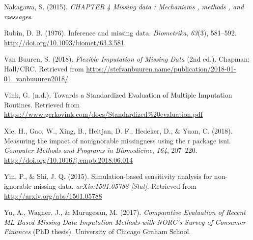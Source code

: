 \documentclass[12pt,oneside]{chicagocapstone}
\begin{document}
\hypertarget{ref-nakagawa_chapter_2015}{}
Nakagawa, S. (2015). \emph{CHAPTER 4 Missing data : Mechanisms , methods
, and messages}.

\hypertarget{ref-rubin_inference_1976}{}
Rubin, D. B. (1976). Inference and missing data. \emph{Biometrika},
\emph{63}(3), 581--592. \url{http://doi.org/10.1093/biomet/63.3.581}

\hypertarget{ref-van_buuren_flexible_2018}{}
Van Buuren, S. (2018). \emph{Flexible Imputation of Missing Data} (2nd
ed.). Chapman; Hall/CRC. Retrieved from
\url{https://stefvanbuuren.name/publication/2018-01-01_vanbuuuren2018/}

\hypertarget{ref-vink_towards_nodate}{}
Vink, G. (n.d.). Towards a Standardized Evaluation of Multiple
Imputation Routines. Retrieved from
\url{https://www.gerkovink.com/docs/Standardized\%20evaluation.pdf}

\hypertarget{ref-xie_measuring_2018}{}
Xie, H., Gao, W., Xing, B., Heitjan, D. F., Hedeker, D., \& Yuan, C.
(2018). Measuring the impact of nonignorable missingness using the r
package isni. \emph{Computer Methods and Programs in Biomedicine},
\emph{164}, 207--220. \url{http://doi.org/10.1016/j.cmpb.2018.06.014}

\hypertarget{ref-yin_simulation_based_2015}{}
Yin, P., \& Shi, J. Q. (2015). Simulation-based sensitivity analysis for
non-ignorable missing data. \emph{arXiv:1501.05788 {[}Stat{]}}.
Retrieved from \url{http://arxiv.org/abs/1501.05788}

\hypertarget{ref-yu_comparative_2017}{}
Yu, A., Wagner, J., \& Murugesan, M. (2017). \emph{Comparative
Evaluation of Recent ML Based Missing Data Imputation Methods with
NORC's Survey of Consumer Finances} (PhD thesis). University of Chicago
Graham School.


\end{document}
